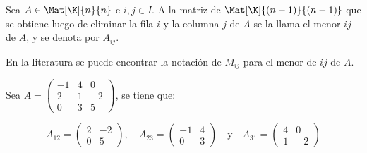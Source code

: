 \documentclass[compacto,10pt]{pubciencias-notas}
\begin{document}
\begin{defi}[Menor]
    Sea $A\in \Mat[\K]{n}{n}$ e $i,j\in I$. A la matriz de $\Mat[\K]{(n-1)}{(n-1)}$ que se obtiene luego de eliminar la fila $i$ y la columna $j$ de $A$ se la llama el menor $ij$ de $A$, y se denota por $A_{ij}$.
\end{defi}

\begin{advertencia}
    En la literatura se puede encontrar la notación de $M_{ij}$ para el menor de $ij$ de $A$.
\end{advertencia}

\begin{ejem}\hspace{0pt}

    Sea
    $A = \begin{pmatrix}
        -1 & 4 & 0 \\
        2 & 1 & -2 \\
        0 & 3 & 5
    \end{pmatrix}$, se tiene que:
    
    \[A_{12} = \begin{pmatrix}
        2 & -2 \\
        0 & 5
    \end{pmatrix}, \quad 
    A_{23} = \begin{pmatrix}
        -1 & 4 \\
        0 & 3
    \end{pmatrix} \quad \text{y} \quad 
    A_{31} = \begin{pmatrix}
        4 & 0 \\
        1 & -2
    \end{pmatrix}
    \]
    

\end{ejem}
\end{document}
